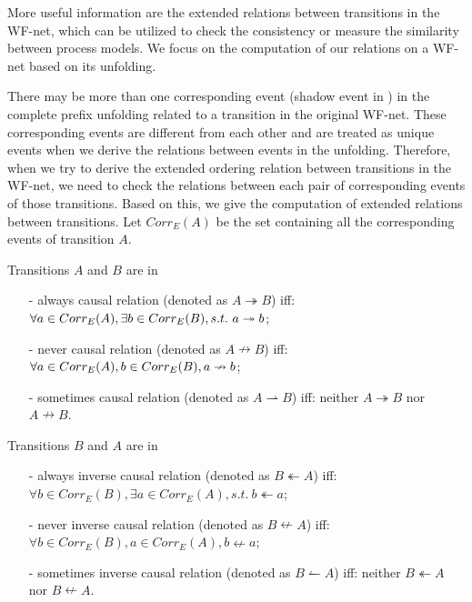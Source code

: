 \documentclass{llncs}
\begin{document}
More useful information are the extended relations between transitions in the WF-net, which can be utilized to check the consistency or measure the similarity between process models. We focus on the computation of our relations on a WF-net based on its unfolding.

There may be more than one corresponding event (shadow event in \cite{wang2013efficient}) in the complete prefix unfolding related to a transition in the original WF-net. These corresponding events are different from each other and are treated as unique events when we derive the relations between events in the unfolding. Therefore, when we try to derive the extended ordering relation between transitions in the WF-net, we need to check the relations between each pair of corresponding events of those transitions. Based on this, we give the computation of extended relations between transitions. Let $Corr_{E}(A)$ be the set containing all the corresponding events of transition $A$.

\begin{definition}\label{def:causalRelations}
Transitions $A$ and $B$ are in
	\begin{itemize}
		\item[-] always causal relation (denoted as $A\twoheadrightarrow B$) iff: $\forall a\in Corr_{E}(A), \exists b\in Corr_{E}(B),\\s.t.~a\twoheadrightarrow b$;
		\item[-] never causal relation (denoted as $A\nrightarrow B$) iff: $\forall a\in Corr_{E}(A), b\in Corr_{E}(B),\\a\nrightarrow b$;
		\item[-] sometimes causal relation (denoted as $A\rightharpoonup B$) iff: neither $A\twoheadrightarrow B$ nor $A\nrightarrow B$.
	\end{itemize}
\end{definition}

\begin{definition}\label{def:inverseCausalRelations}
Transitions $B$ and $A$ are in
	\begin{itemize}
		\item[-] always inverse causal relation (denoted as $B\twoheadleftarrow A$) iff: $\forall b\in Corr_{E}(B), \exists a\in Corr_{E}(A), s.t.~b\twoheadleftarrow a$;
		\item[-] never inverse causal relation (denoted as $B\nleftarrow A$) iff: $\forall b\in Corr_{E}(B), a\in Corr_{E}(A), b\nleftarrow a$;
		\item[-] sometimes inverse causal relation (denoted as $B\leftharpoonup A$) iff: neither $B\twoheadleftarrow A$ nor $B\nleftarrow A$.
	\end{itemize}
\end{definition}
\end{document}
